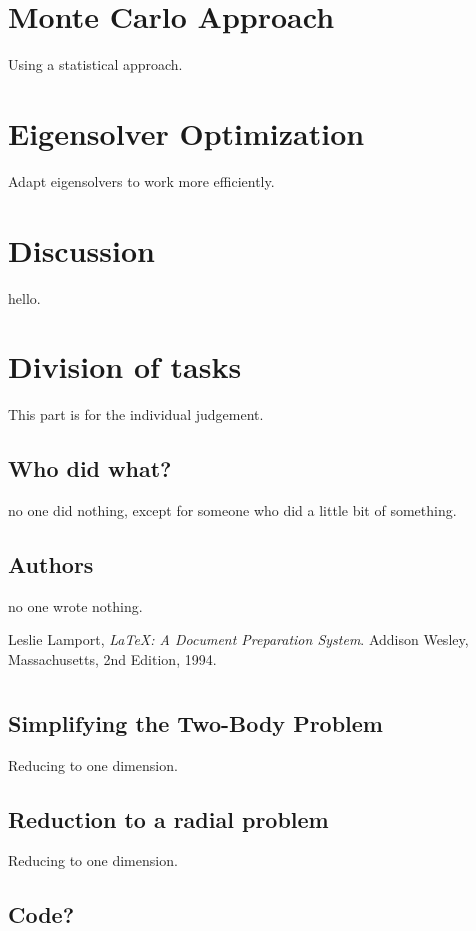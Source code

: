 \documentclass[12pt,a4paper]{report}
\begin{document}
\chapter{Monte Carlo Approach}
\label{cha:monte_carlo_approach}

Using a statistical approach.

\chapter{Eigensolver Optimization}
\label{cha: eigensolver}

Adapt eigensolvers to work more efficiently.

\chapter{Discussion}
\label{discussion}

hello.

\chapter{Division of tasks}
\label{division}
This part is for the individual judgement.

\section{Who did what?}
no one did nothing, except for someone who did a little bit of something.
\section{Authors}
no one wrote nothing.


\begin{thebibliography}{9}

  Leslie Lamport,
  \emph{\LaTeX: A Document Preparation System}.
  Addison Wesley, Massachusetts,
  2nd Edition,
  1994.

\end{thebibliography}

\appendix

\chapter{}

\section{Simplifying the Two-Body Problem} %
\label{sec:the_two_body_problem}

Reducing to one dimension.


\section{Reduction to a radial problem} %
\label{sec:reduction_to_a_radial_problem}

Reducing to one dimension.



\section{Code?} %
\label{sec:code}

\end{document}
